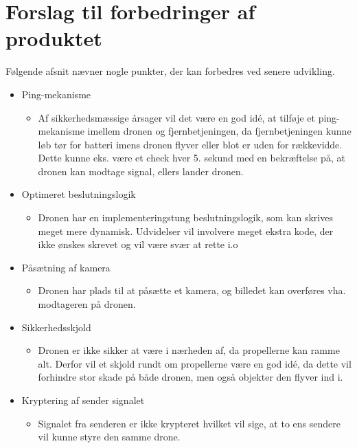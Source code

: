 \documentclass[Main]{subfiles}
\begin{document}
\section{Forslag til forbedringer af produktet}

Følgende afsnit nævner nogle punkter, der kan forbedres ved senere udvikling.
\vspace{-20pt}
\begin{itemize}
\item Ping-mekanisme
\vspace{-10pt}
	\begin{itemize}
	\item Af sikkerhedsmæssige årsager vil det være en god idé, at tilføje et ping-mekanisme imellem dronen og fjernbetjeningen, da fjernbetjeningen kunne løb tør for batteri imens dronen flyver eller blot er uden for rækkevidde. 
	Dette kunne eks. være et check hver 5. sekund med en bekræftelse på, at dronen kan modtage signal, ellers lander dronen.
	\end{itemize}

\item Optimeret beslutningslogik
\vspace{-10pt}
	\begin{itemize}
	\item Dronen har en implementeringstung beslutningslogik, som kan skrives meget mere dynamisk. Udvidelser vil involvere meget ekstra kode, der ikke ønskes skrevet og vil være svær at rette i.o
	\end{itemize}
	
\item Påsætning af kamera
\vspace{-10pt}
	\begin{itemize}
	\item Dronen har plads til at påsætte et kamera, og billedet kan overføres vha. modtageren på dronen.
	\end{itemize}
	
\item Sikkerhedsskjold
\vspace{-10pt}
	\begin{itemize}
	\item Dronen er ikke sikker at være i nærheden af, da propellerne kan ramme alt.
Derfor vil et skjold rundt om propellerne være en god idé, da dette vil forhindre stor skade på både dronen, men også objekter den flyver ind i.
	\end{itemize}

	
\item Kryptering af sender signalet
\vspace{-10pt}
	\begin{itemize}
	\item Signalet fra senderen er ikke krypteret hvilket vil sige, at to ens sendere vil kunne styre den samme drone.
	\end{itemize}



\end{itemize}
\end{document}
